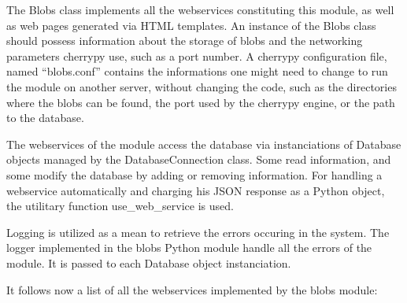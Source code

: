 The Blobs class implements all the webservices constituting this module, as well as web pages generated via HTML templates. An instance of the Blobs class should possess information about the storage of blobs and the networking parameters cherrypy use, such as a port number. A cherrypy configuration file, named ``blobs.conf'' contains the informations one might need to change to run the module on another server, without changing the code, such as the directories where the blobs can be found, the port used by the cherrypy engine, or the path to the database.

The webservices of the module access the database via instanciations of Database objects managed by the DatabaseConnection class. Some read information, and some modify the database by adding or removing information. For handling a webservice automatically and charging his JSON response as a Python object, the utilitary function use\_web\_service is used.

Logging is utilized as a mean to retrieve the errors occuring in the system. The logger implemented in the blobs Python module handle all the errors of the module. It is passed to each Database object instanciation.

It follows now a list of all the webservices implemented by the blobs module: 

